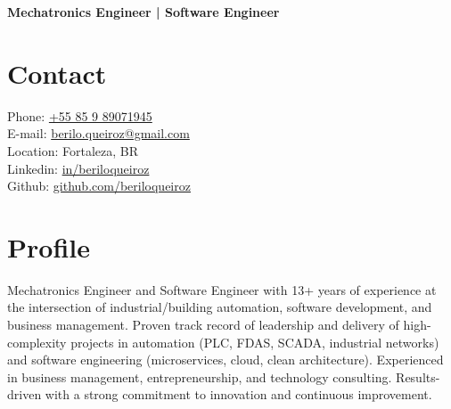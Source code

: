 \documentclass[11pt,a4paper,sans]{moderncv}
\begin{document}
\makecvtitle
\vspace*{-10mm}
\begin{center}\textbf{Mechatronics Engineer | Software Engineer}\end{center}

\section{Contact}{
  \begin{samepage}
	  \faMobile\enspace Phone: {\color{blue}\href{tel:+5585989071945}{+55 85 9 89071945}} \\
	  \faEnvelope\enspace E-mail: {\color{blue}\href{mailto:berilo.queiroz@gmail.com}{berilo.queiroz@gmail.com}} \\
	  \faHome\enspace Location: Fortaleza, BR \\
	  \faLinkedin\enspace Linkedin: {\color{blue}\href{https://www.linkedin.com/in/beriloqueiroz}{in/beriloqueiroz}}\\
	  \faGithub\enspace Github: {\color{blue}\href{https://github.com/beriloqueiroz}{github.com/beriloqueiroz}}
  \end{samepage}
 }

\section{Profile}
 {
  Mechatronics Engineer and Software Engineer with 13+ years of experience at the intersection of
  industrial/building automation, software development, and business management. Proven track record
  of leadership and delivery of high-complexity projects in automation (PLC, FDAS, SCADA, industrial
  networks) and software engineering (microservices, cloud, clean architecture). Experienced in business
  management, entrepreneurship, and technology consulting. Results-driven with a strong commitment to
  innovation and continuous improvement.
 }
\end{document}
